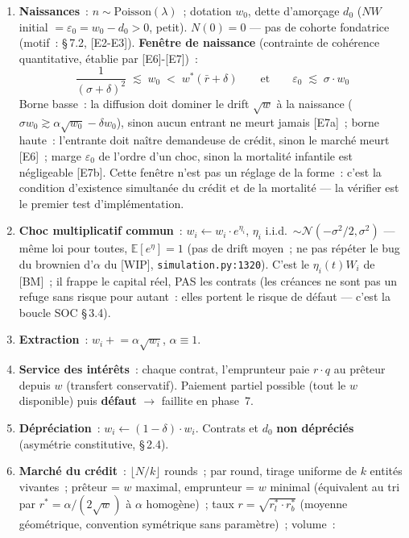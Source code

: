 \documentclass[11pt,a4paper]{article}
\newcommand{\NW}{\mathit{NW}}
\begin{document}
\begin{enumerate}
  \item \textbf{Naissances}~: $n \sim \mathrm{Poisson}(\lambda)$~; dotation $w_0$, dette d'amorçage $d_0$ ($\NW$ initial $= \varepsilon_0 = w_0 - d_0 > 0$, petit). \textbf{$N(0)=0$} --- pas de cohorte fondatrice (motif~: \S\,7.2, [E2-E3]). \textbf{Fenêtre de naissance} (contrainte de cohérence quantitative, établie par [E6]-[E7])~:
  \[
    \frac{1}{(\sigma+\delta)^2} \;\lesssim\; w_0 \;<\; w^*(\bar r+\delta) \qquad\text{et}\qquad \varepsilon_0 \;\lesssim\; \sigma\cdot w_0
  \]
  Borne basse~: la diffusion doit dominer le drift $\sqrt{w}$ à la naissance ($\sigma w_0 \gtrsim \alpha\sqrt{w_0} - \delta w_0$), sinon aucun entrant ne meurt jamais [E7a]~; borne haute~: l'entrante doit naître demandeuse de crédit, sinon le marché meurt [E6]~; marge $\varepsilon_0$ de l'ordre d'un choc, sinon la mortalité infantile est négligeable [E7b]. Cette fenêtre n'est pas un réglage de la forme~: c'est la condition d'existence simultanée du crédit et de la mortalité --- la vérifier est le premier test d'implémentation.
  \item \textbf{Choc multiplicatif commun}~: $w_i \leftarrow w_i\cdot e^{\eta_i}$, $\eta_i$ i.i.d.\ $\sim \mathcal N(-\sigma^2/2,\sigma^2)$ --- même loi pour toutes, $\mathbb E[e^\eta]=1$ (pas de drift moyen~; ne pas répéter le bug du brownien d'$\alpha$ du [WIP], \texttt{simulation.py:1320}). C'est le $\eta_i(t)W_i$ de [BM]~; il frappe le capital réel, PAS les contrats (les créances ne sont pas un refuge sans risque pour autant~: elles portent le risque de défaut --- c'est la boucle SOC \S\,3.4).
  \item \textbf{Extraction}~: $w_i \mathrel{+}= \alpha\sqrt{w_i}$, $\alpha \equiv 1$.
  \item \textbf{Service des intérêts}~: chaque contrat, l'emprunteur paie $r\cdot q$ au prêteur depuis $w$ (transfert conservatif). Paiement partiel possible (tout le $w$ disponible) puis \textbf{défaut} $\to$ faillite en phase~7.
  \item \textbf{Dépréciation}~: $w_i \leftarrow (1-\delta)\cdot w_i$. Contrats et $d_0$ \textbf{non dépréciés} (asymétrie constitutive, \S\,2.4).
  \item \textbf{Marché du crédit}~: $\lfloor N/k \rfloor$ rounds~; par round, tirage uniforme de $k$ entités vivantes~; prêteur = $w$ maximal, emprunteur = $w$ minimal (équivalent au tri par $r^* = \alpha/(2\sqrt w)$ à $\alpha$ homogène)~; taux $r = \sqrt{r^*_l\cdot r^*_b}$ (moyenne géométrique, convention symétrique sans paramètre)~; volume~:

\end{enumerate}
\end{document}
